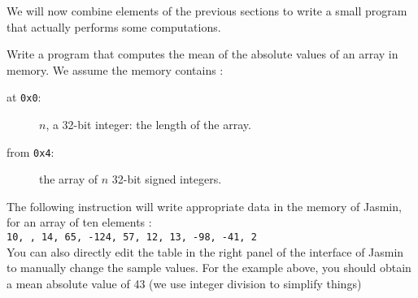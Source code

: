 \documentclass{../../tp}
\begin{document}
We will now combine elements of the previous sections to write a small program that actually performs some computations. 

\begin{instruction}

Write a program that computes the mean of the absolute values of an array in memory.  
We assume the memory contains :
\begin{description}
	\item[at \texttt{0x0}:] $n$, a 32-bit integer: the length of the array.
	\item[from \texttt{0x4}:] the array of $n$ 32-bit signed integers.
\end{description}
 	 
The following instruction will write appropriate data in the memory of \textsf{Jasmin}, for an array of ten elements : \\

 \qquad \texttt{10, ,  14,  65, -124, 57, 12, 13, -98, -41, 2} \\
 
	  
You can also directly edit the table in the right panel of the interface of \textsf{Jasmin} to manually change the sample values. For the example above, you should obtain a mean absolute value of 43 (we use integer division to simplify things)
\end{instruction}
\end{document}
